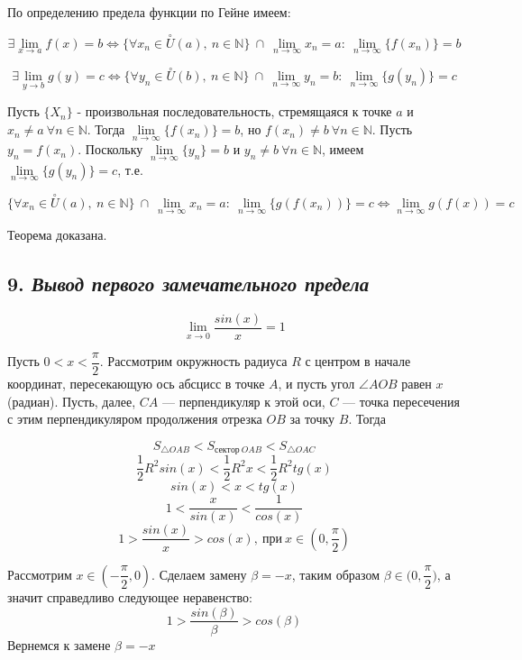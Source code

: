 По определению предела функции по Гейне имеем:

$$
\exists \lim\limits_{x \to a}f(x) = b \iff \{\forall x_n \in \overset{\circ}U(a), \ n \in \mathbb{N}\} \ \cap \ \lim\limits_{n \to \infty}{x_n} = a : \ \lim\limits_{n \to \infty}\{f(x_n)\} = b
$$

$$
\exists \lim\limits_{y \to b}g(y) = c \iff \{\forall y_n \in \overset{\circ}U(b), \ n \in \mathbb{N}\} \ \cap \ \lim\limits_{n \to \infty}{y_n} = b : \ \lim\limits_{n \to \infty}\{g(y_n)\} = c
$$

Пусть $\{X_n\}$ - произвольная последовательность, стремящаяся к точке $a$ и $x_n \neq a \ \forall n \in \mathbb{N}$. Тогда $\lim\limits_{n \to \infty}{\{f(x_n)\}} = b$, но $f(x_n) \neq b \ \forall n \in \mathbb{N}$. Пусть $y_n = f(x_n)$. Поскольку $\lim\limits_{n \to \infty}{\{y_n\}} = b$ и $y_n \neq b \ \forall n \in \mathbb{N}$, имеем $\lim\limits_{n \to \infty}{\{g(y_n)\}} = c$, т.е.

$$
\{\forall x_n \in \overset{\circ}U(a), \ n \in \mathbb{N}\} \ \cap \ \lim\limits_{n \to \infty}{x_n} = a : \ \lim\limits_{n \to \infty}\{g(f(x_n))\} = c \iff \lim\limits_{n \to \infty} g(f(x)) = c
$$

Теорема доказана.
\newpage 
\subsection*{9. \textit{Вывод первого замечательного предела}}
\begin{mainQuote}

$$ \lim\limits_{x \to 0} {\dfrac{sin(x)}{x}} = 1 $$
\end{mainQuote}




Пусть $0 < x < {\dfrac{\pi}{2}}$. Рассмотрим окружность радиуса $R$ с центром в начале координат, пересекающую ось абсцисс в точке $A$, и пусть угол $\angle AOB$ равен $x$ (радиан). Пусть, далее, $CA$ — перпендикуляр к этой оси, $C$ — точка пересечения с этим перпендикуляром продолжения отрезка $OB$ за точку $B$. Тогда

$$S_{\triangle OAB} < S_{сектор \ OAB} < S_{\triangle OAC}$$ $$\dfrac{1}{2}R^2sin(x) <\dfrac{1}{2}R^2x < \dfrac{1}{2}R^2tg(x)$$ $$sin(x) < x < tg(x)$$ $$1 < \dfrac{x}{sin(x)} < \dfrac{1}{cos(x)}$$ $$1 > \dfrac{sin(x)}{x} > cos(x), \ \text{при} \ x \in (0, \dfrac{\pi}{2})$$

Рассмотрим $x \in (-{\dfrac{\pi}{2}}, 0)$. Сделаем замену $\beta = -x$, таким образом $\beta \in (0, {\dfrac{\pi}{2})}$, а значит справедливо следующее неравенство: $$1 > \dfrac{sin(\beta)}{\beta} > cos(\beta)$$ Вернемся к замене $\beta = -x$

